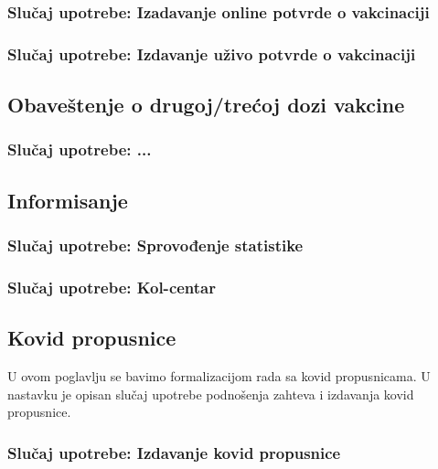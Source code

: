 \documentclass[titlepage]{article}
\begin{document}
\subsubsection{Slučaj upotrebe: Izadavanje online potvrde o vakcinaciji}
\subsubsection{Slučaj upotrebe: Izdavanje uživo potvrde o vakcinaciji}


\subsection{Obaveštenje o drugoj/trećoj dozi vakcine}
\subsubsection{Slučaj upotrebe: ...}

\subsection{Informisanje}
\subsubsection{Slučaj upotrebe: Sprovođenje statistike}
\subsubsection{Slučaj upotrebe: Kol-centar}

\subsection{Kovid propusnice}

U ovom poglavlju se bavimo formalizacijom rada sa kovid propusnicama. U nastavku je opisan slučaj upotrebe podnošenja zahteva i izdavanja kovid propusnice.

\subsubsection{Slučaj upotrebe: Izdavanje kovid propusnice}

\end{document}
